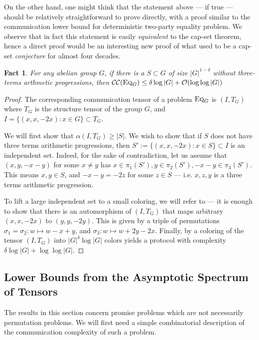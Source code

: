 \documentclass[10pt,a4paper]{article}
\newtheorem{fact}[theorem]{Fact}
\newcommand{\Oh}{\mathcal{O}}
\newcommand{\cc}{\mathcal{CC}}
\newcommand{\eq}{\textsc{Eq}}
\begin{document}
On the other hand, one might think that the statement above --- if true --- should be relatively straightforward to prove directly, with a proof similar to the communication lower bound for deterministic two-party equality problem. We observe that in fact this statement is easily \emph{equivalent} to the cap-set theorem, hence a direct proof would be an interesting new proof of what used to be a cap-set \emph{conjecture} for almost four decades.

\begin{fact}
For any abelian group $G$, if there is a $S \subset G$ of size $|G|^{1-\delta}$ without three-terms arthmetic progressions, then $\cc(\eq_G) \leq \delta \log |G| + \Oh(\log \log |G|)$
\end{fact}
\begin{proof}
The corresponding communication tensor of a problem $\eq_G$ is $(I, T_G)$ where $T_G$ is the structure tensor of the group $G$, and $I = \{ (x,x, -2x) : x \in G \} \subset T_G$.

We will first show that $\alpha(I, T_G) \geq |S|$. We wish to show that if $S$ does not have three terms arithmetic progressions, then $S' := \{ (x,x, -2x) : x \in S \} \subset I$ is an independent set. Indeed, for the sake of contradiction, let us assume that $(x,y,-x-y)$ for some $x\not=y$ has $x \in \pi_1(S'), y \in \pi_2(S'), -x-y \in \pi_3(S')$. This means $x,y \in S$, and $-x-y = - 2z$ for some $z \in S$ --- i.e. $x,z,y$ is a three terms arithmetic progression.

To lift a large independent set to a small coloring, we will refer to  --- it is enough to show that there is an automorphism of $(I, T_G)$ that maps arbitrary $(x,x,-2x)$ to $(y,y,-2y)$. This is given by a triple of permutations $\sigma_1 = \sigma_2 : w \mapsto w - x + y$, and $\sigma_3 : w \mapsto w + 2y - 2x$. Finally, by  a coloring of the tensor $(I, T_G)$ into $|G|^{\delta} \log |G|$ colors yields a protocol with complexity $\delta \log |G|  + \log \log |G|$.
\end{proof}



\subsection{Lower Bounds from the Asymptotic Spectrum of Tensors}
The results in this section concern promise problems which are not necessarily permutation problems. We will first need a simple combinatorial description of the communication complexity of such a problem.
\end{document}
